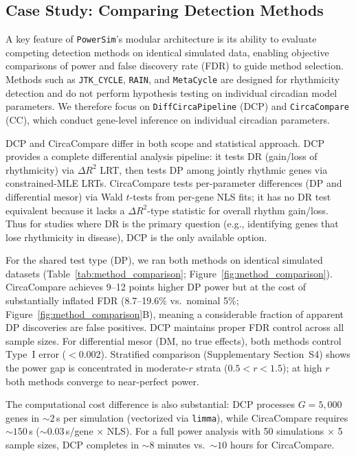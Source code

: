 \documentclass{article}
\newcommand{\software}[1]{\texttt{#1}}
\begin{document}
\subsection{Case Study: Comparing Detection Methods}

A key feature of \software{PowerSim}'s modular architecture is its ability to evaluate competing detection methods on identical simulated data, enabling objective comparisons of power and false discovery rate (FDR) to guide method selection. Methods such as \software{JTK\_CYCLE}, \software{RAIN}, and \software{MetaCycle} are designed for rhythmicity detection and do not perform hypothesis testing on individual circadian model parameters. We therefore focus on \software{DiffCircaPipeline} (DCP) and \software{CircaCompare} (CC), which conduct gene-level inference on individual circadian parameters.

DCP and CircaCompare differ in both scope and statistical approach. DCP provides a complete differential analysis pipeline: it tests DR (gain/loss of rhythmicity) via $\Delta R^2$ LRT, then tests DP among jointly rhythmic genes via constrained-MLE LRTs. CircaCompare tests per-parameter differences (DP and differential mesor) via Wald $t$-tests from per-gene NLS fits; it has no DR test equivalent because it lacks a $\Delta R^2$-type statistic for overall rhythm gain/loss. Thus for studies where DR is the primary question (e.g., identifying genes that lose rhythmicity in disease), DCP is the only available option.

For the shared test type (DP), we ran both methods on identical simulated datasets (Table~\ref{tab:method_comparison}; Figure~\ref{fig:method_comparison}). CircaCompare achieves 9--12 points higher DP power but at the cost of substantially inflated FDR (8.7--19.6\% vs.\ nominal 5\%; Figure~\ref{fig:method_comparison}B), meaning a considerable fraction of apparent DP discoveries are false positives. DCP maintains proper FDR control across all sample sizes. For differential mesor (DM, no true effects), both methods control Type~I error ($<0.002$). Stratified comparison (Supplementary Section~S4) shows the power gap is concentrated in moderate-$r$ strata ($0.5 < r < 1.5$); at high $r$ both methods converge to near-perfect power.

The computational cost difference is also substantial: DCP processes $G = 5{,}000$ genes in ${\sim}2$\,s per simulation (vectorized via \texttt{limma}), while CircaCompare requires ${\sim}150$\,s (${\sim}0.03$\,s/gene $\times$ NLS). For a full power analysis with 50 simulations $\times$ 5 sample sizes, DCP completes in ${\sim}8$ minutes vs.\ ${\sim}10$ hours for CircaCompare.
\end{document}
